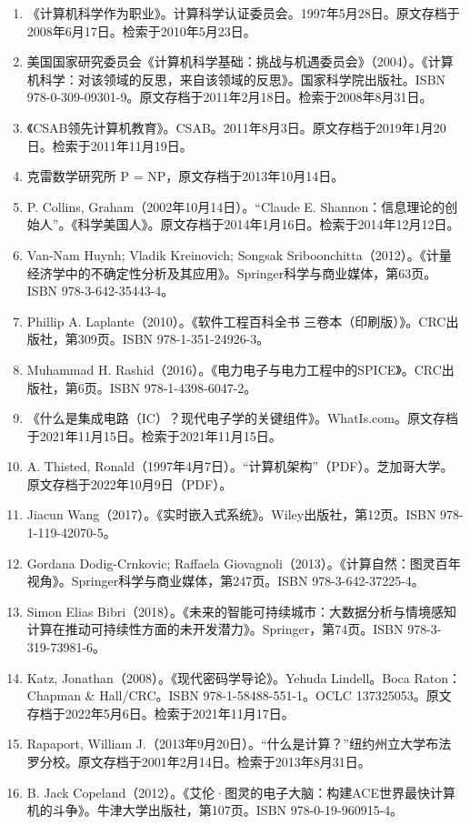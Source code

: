 \begin{enumerate}
\item 《计算机科学作为职业》。计算科学认证委员会。1997年5月28日。原文存档于2008年6月17日。检索于2010年5月23日。  
\item 美国国家研究委员会《计算机科学基础：挑战与机遇委员会》（2004）。《计算机科学：对该领域的反思，来自该领域的反思》。国家科学院出版社。ISBN 978-0-309-09301-9。原文存档于2011年2月18日。检索于2008年8月31日。  
\item 《CSAB领先计算机教育》。CSAB。2011年8月3日。原文存档于2019年1月20日。检索于2011年11月19日。  
\item 克雷数学研究所 P = NP，原文存档于2013年10月14日。  
\item P. Collins, Graham（2002年10月14日）。“Claude E. Shannon：信息理论的创始人”。《科学美国人》。原文存档于2014年1月16日。检索于2014年12月12日。
\item Van-Nam Huynh; Vladik Kreinovich; Songsak Sriboonchitta（2012）。《计量经济学中的不确定性分析及其应用》。Springer科学与商业媒体，第63页。ISBN 978-3-642-35443-4。  
\item Phillip A. Laplante（2010）。《软件工程百科全书 三卷本（印刷版）》。CRC出版社，第309页。ISBN 978-1-351-24926-3。  
\item Muhammad H. Rashid（2016）。《电力电子与电力工程中的SPICE》。CRC出版社，第6页。ISBN 978-1-4398-6047-2。  
\item 《什么是集成电路（IC）？现代电子学的关键组件》。WhatIs.com。原文存档于2021年11月15日。检索于2021年11月15日。  
\item A. Thisted, Ronald（1997年4月7日）。“计算机架构”（PDF）。芝加哥大学。原文存档于2022年10月9日（PDF）。  
\item Jiacun Wang（2017）。《实时嵌入式系统》。Wiley出版社，第12页。ISBN 978-1-119-42070-5。  
\item Gordana Dodig-Crnkovic; Raffaela Giovagnoli（2013）。《计算自然：图灵百年视角》。Springer科学与商业媒体，第247页。ISBN 978-3-642-37225-4。  
\item Simon Elias Bibri（2018）。《未来的智能可持续城市：大数据分析与情境感知计算在推动可持续性方面的未开发潜力》。Springer，第74页。ISBN 978-3-319-73981-6。  
\item Katz, Jonathan（2008）。《现代密码学导论》。Yehuda Lindell。Boca Raton：Chapman & Hall/CRC。ISBN 978-1-58488-551-1。OCLC 137325053。原文存档于2022年5月6日。检索于2021年11月17日。  
\item Rapaport, William J.（2013年9月20日）。“什么是计算？”纽约州立大学布法罗分校。原文存档于2001年2月14日。检索于2013年8月31日。
\item B. Jack Copeland（2012）。《艾伦·图灵的电子大脑：构建ACE世界最快计算机的斗争》。牛津大学出版社，第107页。ISBN 978-0-19-960915-4。  

\end{enumerate}
